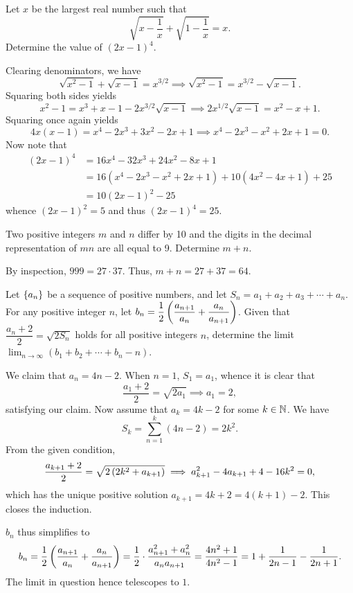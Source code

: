 \begin{question}[25]\label{A::2023-O-1-16}
    Let $x$ be the largest real number such that \[\sqrt{x - \dfrac1x} + \sqrt{1 - \dfrac1x} = x.\] Determine the value of $(2x-1)^4$.
\end{question}

Clearing denominators, we have \[\sqrt{x^2 - 1} + \sqrt{x - 1} = x^{3/2} \implies \sqrt{x^2 - 1} = x^{3/2} - \sqrt{x-1}.\] Squaring both sides yields \[x^2 - 1 = x^3 + x - 1 - 2x^{3/2}\sqrt{x-1} \implies 2x^{1/2}\sqrt{x-1} = x^2 - x + 1.\] Squaring once again yields \[4x(x-1) = x^4 - 2x^3 + 3x^2 - 2x + 1 \implies x^4 - 2x^3 - x^2 + 2x + 1 = 0.\] Now note that \begin{align*}
    (2x-1)^4 &= 16x^4 - 32 x^3 + 24x^2 - 8x + 1\\
    &= 16(x^4 - 2x^3 -x^2 + 2x + 1) + 10(4x^2 - 4x + 1) + 25\\
    &= 10(2x-1)^2 - 25
\end{align*}
whence $(2x-1)^2 = 5$ and thus $(2x-1)^4 = 25$.
   
\begin{question}[64]\label{A::2023-O-1-17}
    Two positive integers $m$ and $n$ differ by 10 and the digits in the decimal representation of $mn$ are all equal to 9. Determine $m + n$.
\end{question}

By inspection, $999 = 27 \cdot 37$. Thus, $m + n = 27 + 37 = 64$.
    
\begin{question}[1]\label{A::2023-O-1-18}
    Let $\left\lbrace a_n \right\rbrace$ be a sequence of positive numbers, and let $S_n = a_1 + a_2 + a_3 + \cdots + a_n$. For any positive integer $n$, let $b_n = \dfrac12 \left( \dfrac{a_{n+1}}{a_n} + \dfrac{a_n}{a_{n+1}} \right)$. Given that $\dfrac{a_n + 2}{2} = \sqrt{2S_n}$ holds for all positive integers $n$, determine the limit $\lim_{n \to \infty} (b_1 + b_2 + \cdots + b_n - n)$.
\end{question}

We claim that $a_n = 4n - 2$. When $n = 1$, $S_1 = a_1$, whence it is clear that \[\frac{a_1 + 2}{2} = \sqrt{2a_1} \implies a_1 = 2,\] satisfying our claim. Now assume that $a_k = 4k - 2$ for some $k \in \mathbb{N}$. We have \[S_k = \sum_{n = 1}^k (4n - 2) = 2k^2.\] From the given condition, \[\frac{a_{k+1} + 2}{2} = \sqrt{2 \left( 2k^2 + a_{k+1} \right)} \implies a^2_{k+1} - 4a_{k+1} + 4 - 16k^2 = 0,\] which has the unique positive solution $a_{k+1} = 4k + 2 = 4(k+1) - 2$. This closes the induction.

$b_n$ thus simplifies to \[b_n = \frac12 \left( \dfrac{a_{n+1}}{a_n} + \dfrac{a_n}{a_{n+1}} \right) = \frac12 \cdot \frac{a^2_{n+1} + a^2_n}{a_n a_{n+1}} = \frac{4n^2 + 1}{4n^2 - 1} = 1 + \frac1{2n-1} - \frac{1}{2n+1}.\] The limit in question hence telescopes to $1$.
    
